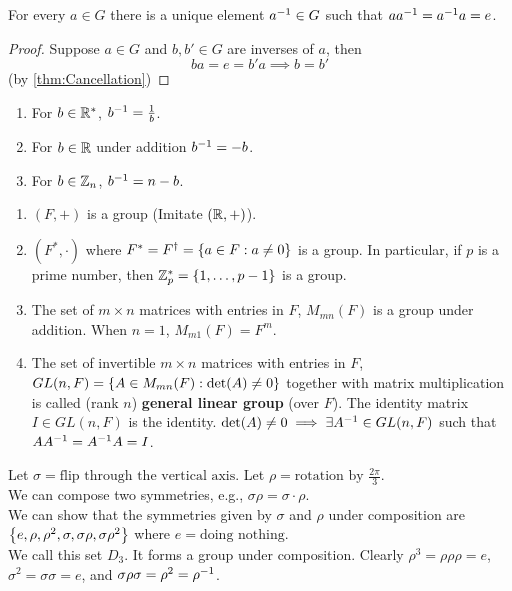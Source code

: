 \begin{theorem}
    For every $a \in G$ there is a unique element $a^{-1} \in G$ such that $a a^{-1} = a^{-1} a = e$.
\end{theorem}
\begin{proof}
    Suppose $a \in G$ and $b, b' \in G$ are inverses of $a$, then 
    $$ba = e = b'a \implies b = b'$$ (by \cref{thm:Cancellation})
\end{proof}

\begin{example}
    \spacebeforelist
    \begin{enumerate}
        \item For $b \in \mathbb{R}^*$, $b^{-1} = \frac{1}{b}$.
        \item For $b \in \mathbb{R}$ under addition $b^{-1} = -b$.
        \item For $b \in \mathbb{Z}_n$, $b^{-1} = n - b$.
    \end{enumerate}
\end{example}

\begin{example}
    \spacebeforelist
    \begin{enumerate}
        \item $(F, +)$ is a group (Imitate $(\mathbb{R}, +)$).
        \item $(F^*, \cdot)$ where $F^* = F^\dag = \left\{a \in F: a \neq 0\right\}$ is a group. In particular, if $p$ is a prime number, then $\mathbb{Z}_p^* = \left\{1, \dots, p - 1\right\}$ is a group.
        \item The set of $m \times n$ matrices with entries in $F$, $M_{mn}(F)$ is a group under addition. When $n=1$, $M_{m1}(F) = F^m$.
        \item The set of invertible $m \times n$ matrices with entries in $F$, $GL(n,F) = \left\{A \in M_{mn}(F): \mathrm{det}(A) \neq 0\right\}$ together with matrix multiplication is called (rank $n$) \textbf{general linear group} (over $F$). The identity matrix $I \in GL(n, F)$ is the identity. $\mathrm{det}(A) \neq 0 \implies \exists A^{-1} \in GL(n,F)$ such that $A A^{-1} = A^{-1} A = I$.
    \end{enumerate}
\end{example}

\begin{example}
    Let $\sigma = \text{flip through the vertical axis}$. Let $\rho = \text{rotation by } \frac{2\pi}{3}$. \\
    We can compose two symmetries, e.g., $\sigma\rho = \sigma \cdot \rho$. \\
    We can show that the symmetries given by $\sigma$ and $\rho$ under composition are $\left\{e, \rho, \rho^2, \sigma, \sigma\rho, \sigma\rho^2\right\}$ where $e = \text{doing nothing}$. \\
    We call this set $D_3$. It forms a group under composition. Clearly $\rho^3 = \rho\rho\rho = e$, $\sigma^2 = \sigma\sigma = e$, and $\sigma\rho\sigma = \rho^2 = \rho^{-1}$.
\end{example}

